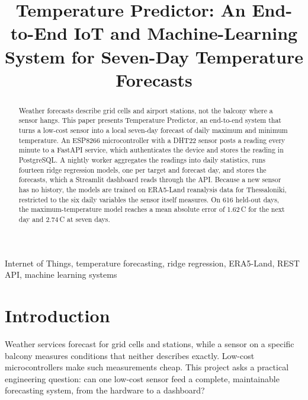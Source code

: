 \documentclass[conference]{IEEEtran}
\newcommand{\todo}[1]{\textcolor{red}{[TODO: #1]}}
\newcommand{\degc}{\,\textdegree C}
\begin{document}
\title{Temperature Predictor: An End-to-End IoT and Machine-Learning System for Seven-Day Temperature Forecasts}

\author{
\IEEEauthorblockA{\textit{\todo{Department}} \\
\textit{\todo{University}} \\
Thessaloniki, Greece \\
\todo{e-mail}}
}

\maketitle

\begin{abstract}
Weather forecasts describe grid cells and airport stations, not the balcony where a sensor hangs. This paper presents Temperature Predictor, an end-to-end system that turns a low-cost sensor into a local seven-day forecast of daily maximum and minimum temperature. An ESP8266 microcontroller with a DHT22 sensor posts a reading every minute to a FastAPI service, which authenticates the device and stores the reading in PostgreSQL. A nightly worker aggregates the readings into daily statistics, runs fourteen ridge regression models, one per target and forecast day, and stores the forecasts, which a Streamlit dashboard reads through the API. Because a new sensor has no history, the models are trained on ERA5-Land reanalysis data for Thessaloniki, restricted to the six daily variables the sensor itself measures. On 616 held-out days, the maximum-temperature model reaches a mean absolute error of 1.62\degc{} for the next day and 2.74\degc{} at seven days.
\end{abstract}

\begin{IEEEkeywords}
Internet of Things, temperature forecasting, ridge regression, ERA5-Land, REST API, machine learning systems
\end{IEEEkeywords}

\section{Introduction}
\label{sec:intro}

Weather services forecast for grid cells and stations, while a sensor on a specific balcony measures conditions that neither describes exactly. Low-cost microcontrollers make such measurements cheap. This project asks a practical engineering question: can one low-cost sensor feed a complete, maintainable forecasting system, from the hardware to a dashboard?
\end{document}
